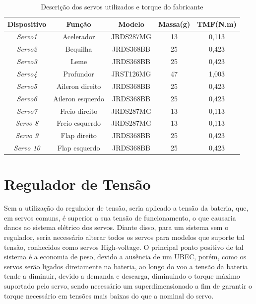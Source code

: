 \begin{table}[H]
\centering
\caption{Descrição dos servos utilizados e torque do fabricante}
\label{tab: desc.servo}
\begin{tabular}{|c|c|c|c|c|}
\hline
\textbf{Dispositivo} & \textbf{Função}  & \textbf{Modelo} & \textbf{Massa(g)} & \textbf{TMF(N.m)} \\ \hline
\textit{Servo1}      & Acelerador       & JRDS287MG       & 13                & 0,113             \\ \hline
\textit{Servo2}      & Bequilha         & JRDS368BB       & 25                & 0,423             \\ \hline
\textit{Servo3}      & Leme             & JRDS368BB       & 25                & 0,423             \\ \hline
\textit{Servo4}      & Profundor        & JRST126MG       & 47                & 1,003             \\ \hline
\textit{Servo5}      & Aileron direito  & JRDS368BB       & 25                & 0,423             \\ \hline
\textit{Servo6}      & Aileron esquerdo & JRDS368BB       & 25                & 0,423             \\ \hline
\textit{Servo7}      & Freio direito    & JRDS287MG       & 13                & 0,113             \\ \hline
\textit{Servo 8}     & Freio esquerdo   & JRDS287MG       & 13                & 0,113             \\ \hline
\textit{Servo 9}     & Flap direito     & JRDS368BB       & 25                & 0,423             \\ \hline
\textit{Servo 10}    & Flap esquerdo    & JRDS368BB       & 25                & 0,423             \\ \hline
\end{tabular}
\end{table}

\section{Regulador de Tensão}

Sem a utilização do regulador de tensão, seria aplicado a tensão da bateria, que, em
servos comuns, é superior a sua tensão de funcionamento, o que causaria danos ao sistema
elétrico dos servos. Diante disso, para um sistema sem o regulador, seria necessário alterar todos
os servos para modelos que suporte tal tensão, conhecidos como servos High-voltage. O
principal ponto positivo de tal sistema é a economia de peso, devido a ausência de um UBEC,
porém, como os servos serão ligados diretamente na bateria, ao longo do voo a tensão da bateria
tende a diminuir, devido a demanda e descarga, diminuindo o torque máximo suportado pelo
servo, sendo necessário um superdimensionado a fim de garantir o torque necessário em tensões
mais baixas do que a nominal do servo.

